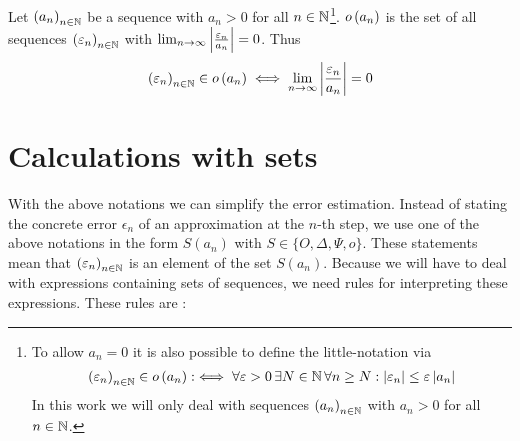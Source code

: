 \begin{definition}
  Let $\left({a_n}\right)_{{n}\in\mathbb N}$ be a sequence with $a_n > 0$ for all $n\in\mathbb N$\footnote{To allow $a_n=0$ it is also possible to define the little-notation via~\cite[pp.~448]{graham}\cite{wiki:bigo}
  \begin{align}
    \left({\varepsilon_n}\right)_{{n}\in\mathbb N}\in o\left( {a_n} \right) :\iff \forall \varepsilon > 0\, \exists N\in\mathbb N\, \forall n \ge N: \left|{\varepsilon_n}\right| \le \varepsilon \left|{a_n}\right|
  \end{align}
   In this work we will only deal with sequences $\left({a_n}\right)_{{n}\in\mathbb N}$ with $a_n > 0$ for all $n\in\mathbb N$.
}. $o\left( {a_n} \right)$ is the set of all sequences $\left({\varepsilon_n}\right)_{{n}\in\mathbb N}$ with $\lim_{n\to\infty} \left|{\frac{\varepsilon_n}{a_n}}\right| = 0$. Thus
  \begin{align}
    \left({\varepsilon_n}\right)_{{n}\in\mathbb N}\in o\left( {a_n} \right) \iff \lim_{n\to\infty} \left|{\frac{\varepsilon_n}{a_n}}\right| = 0
  \end{align}
\end{definition}

\section{Calculations with sets} \label{sec:calculations_sets}

With the above notations we can simplify the error estimation. Instead of stating the concrete error $\epsilon_n$ of an approximation at the $n$-th step, we use one of the above notations in the form $S(a_n)$ with $S\in\{O, \Delta, \Psi, o\}$. These statements mean that $\left({\varepsilon_n}\right)_{{n}\in\mathbb N}$ is an element of the set $S(a_n)$. Because we will have to deal with expressions containing sets of sequences, we need rules for interpreting these expressions. These rules are \cite{bigo_rules1}\cite[pp. 17-18]{kulla}:

